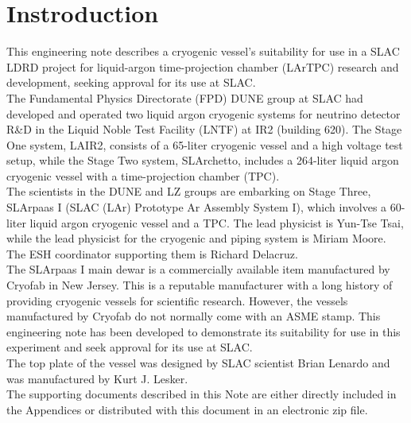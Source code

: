 \section{Instroduction}
\label{sec:intro}

This engineering note describes a cryogenic vessel's suitability for use in 
a SLAC LDRD project for liquid-argon time-projection chamber (LArTPC) research
and development,
seeking approval for its use at SLAC.\\

The Fundamental Physics Directorate (FPD) DUNE group at SLAC had developed 
and operated two liquid argon cryogenic systems for neutrino detector R\&D
in the Liquid Noble Test Facility (LNTF) at IR2 (building 620).
The Stage One system, LAIR2, consists of a 65-liter cryogenic vessel and
a high voltage test setup,
while the Stage Two system, SLArchetto, includes a 264-liter liquid argon
cryogenic vessel with a time-projection chamber (TPC).\\

The scientists in the DUNE and LZ groups are embarking on Stage Three,
SLArpaas I (SLAC (LAr) Prototype Ar Assembly System I),
which involves a 60-liter liquid argon cryogenic vessel and a TPC.
The lead physicist is Yun-Tse Tsai, while the lead physicist for the cryogenic
and piping system is Miriam Moore.
The ESH coordinator supporting them is Richard Delacruz.\\

The SLArpaas I main dewar is a commercially available item manufactured by Cryofab
in New Jersey.
This is a reputable manufacturer with a long history of providing cryogenic vessels 
for scientific research. 
However, the vessels manufactured by Cryofab do not normally come with an ASME stamp. 
This engineering note has been developed to demonstrate its suitability for use in 
this experiment and seek approval for its use at SLAC.\\

The top plate of the vessel was designed by SLAC scientist Brian Lenardo
and was manufactured by Kurt J. Lesker.\\

The supporting documents described in this Note are either directly included in 
the Appendices or distributed with this document in an electronic zip file.\\

